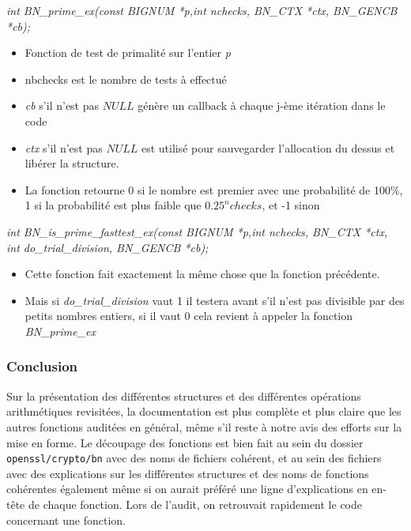 			\textit{int BN\_prime\_ex(const BIGNUM *p,int nchecks, BN\_CTX *ctx, BN\_GENCB *cb);} 
			\begin{itemize}
			\item Fonction de test de primalité sur l'entier \textit{p}
			\item nbchecks est le nombre de tests à effectué
			\item \textit{cb} s'il n'est pas $NULL$ génère un callback à chaque j-ème itération dans le code
			\item \textit{ctx} s'il n'est pas $NULL$ est utilisé pour sauvegarder l'allocation du dessus et libérer la structure.
			\item La fonction retourne 0 si le nombre est premier avec une probabilité de 100\%, 1 si la probabilité est plus faible que $0.25^nchecks$, et -1 sinon\\
			\end{itemize}

			\textit{int BN\_is\_prime\_fasttest\_ex(const BIGNUM *p,int nchecks, BN\_CTX *ctx, int do\_trial\_division, BN\_GENCB *cb);} 
			\begin{itemize}
			\item Cette fonction fait exactement la même chose que la fonction précédente.
			\item Mais si \textit{do\_trial\_division} vaut 1 il testera avant s'il n'est pas divisible par des petits nombres entiers, si il vaut 0 cela revient à appeler la fonction \textit{BN\_prime\_ex}
			\end{itemize}

		\subsubsection{Conclusion}

			Sur la présentation des différentes structures et des différentes opérations arithmétiques revisitées, la documentation est plus complète et plus claire que les autres fonctions auditées en général, même s'il reste à notre avis des efforts sur la mise en forme. Le découpage des fonctions est bien fait au sein du dossier \texttt{openssl/crypto/bn} avec des noms de fichiers cohérent, et au sein des fichiers avec des explications sur les différentes structures et des noms de fonctions cohérentes également même si on aurait préféré une ligne d'explications en en-tête de chaque fonction. Lors de l'audit, on retrouvait rapidement le code concernant une fonction.\\
			

